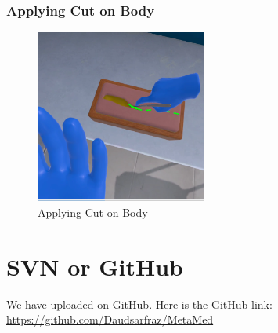 \subsubsection{Applying Cut on Body}
\begin{figure}[h]
	\centering
	\includegraphics[width=0.5\textwidth, height=0.3\textheight]{Images/Applying Cut on Body.png}
	\caption{Applying Cut on Body}
	\label{fig:Applying Cut on Body}
\end{figure}


\section{SVN or GitHub}
We have uploaded on GitHub. Here is the GitHub link: \\
\href{https://github.com/Daudsarfraz/MetaMed}{https://github.com/Daudsarfraz/MetaMed}